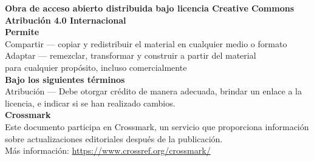 \begin{center}
\small
\textbf{Obra de acceso abierto distribuida bajo licencia Creative Commons Atribución 4.0 Internacional}\\[0.5em]

\textbf{Permite}\\
Compartir — copiar y redistribuir el material en cualquier medio o formato\\
Adaptar — remezclar, transformar y construir a partir del material\\
para cualquier propósito, incluso comercialmente\\[0.5em]

\textbf{Bajo los siguientes términos}\\
Atribución — Debe otorgar crédito de manera adecuada, brindar un enlace a la licencia, e indicar si se han realizado cambios.\\[1em]

\textbf{Crossmark}\\
Este documento participa en Crossmark, un servicio que proporciona información\\
sobre actualizaciones editoriales después de la publicación.\\
Más información: \url{https://www.crossref.org/crossmark/}
\end{center}


\newpage